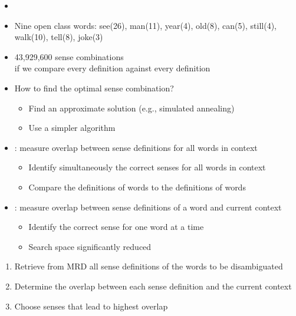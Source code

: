 \documentclass[a4paper,landscape,headrule,footrule,xetex]{foils}
\begin{document}

\begin{itemize}
\item {}
\item Nine open class words:  see(26), man(11), year(4), old(8), can(5), still(4), walk(10), tell(8), joke(3)
\item 43,929,600 sense combinations
\\  if we compare every definition against every definition
\item How to find the optimal sense combination?
  \begin{itemize}
  \item Find an approximate solution (e.g., simulated annealing)
  \item Use a simpler algorithm
  \end{itemize}
\end{itemize}


\begin{itemize}
\item {}: measure overlap between sense
  definitions for all words in context
  \begin{itemize}
  \item  Identify simultaneously the correct senses for all words in context
  \item Compare the definitions of words to the definitions of words
  \end{itemize}
\item {}:  measure overlap between sense definitions of a word and current context
  \begin{itemize}
  \item Identify the correct sense for one word at a time
  \item Search space significantly reduced
  \end{itemize}
\end{itemize}


\begin{enumerate}
\item Retrieve from MRD all sense definitions of the words to be disambiguated
\item Determine the overlap between each sense definition and the current context
\item Choose senses that lead to highest overlap
\end{enumerate}
\end{document}
